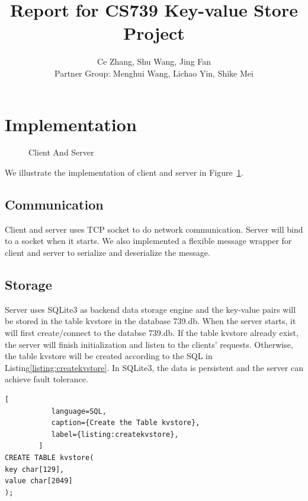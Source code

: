 \documentclass[11pt]{article}
\title{Report for CS739 Key-value Store Project}
\author{Ce Zhang, Shu Wang, Jing Fan\\
        Partner Group: Menghui Wang, Lichao Yin, Shike Mei}
\begin{document}
\maketitle
\section{Implementation}
\begin{figure}[htp]
\caption{Client And Server}
\label{fig:clientandserver} 
\end{figure}
 We illustrate the implementation of client and server in Figure~\ref{fig:clientandserver}. 
 \subsection{Communication}
 Client and server uses TCP socket to do network communication. Server will bind to a socket when it starts. We also implemented a flexible message wrapper for client and server to serialize and deserialize the message.
 \subsection{Storage}
 Server uses SQLite3 as backend data storage engine and the key-value pairs will be stored in the table \textsf{kvstore} in the database \textsf{739.db}. When the server starts, it will first create/connect to the databse \textsf{739.db}. If the table \textsf{kvstore} already exist, the server will finish initialization and listen to the clients' requests. Otherwise, the table \textsf{kvstore} will be created according to the SQL in Listing\ref{listing:createkvstore}. In SQLite3, the data is persistent and the server can achieve fault tolerance.
\begin{lstlisting}[
           language=SQL,
           caption={Create the Table kvstore},
           label={listing:createkvstore},
        ]
CREATE TABLE kvstore(
key char[129],
value char[2049]
);
\end{lstlisting}
\end{document}
